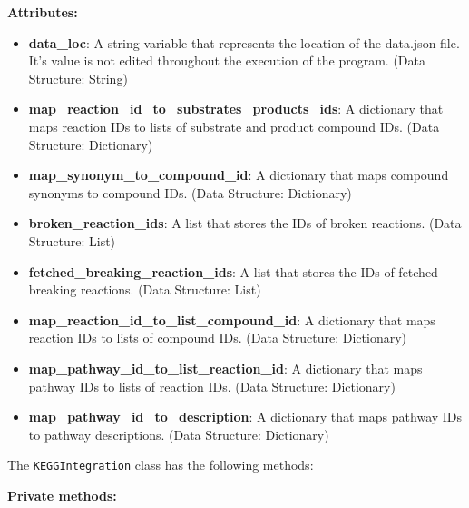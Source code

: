 \textbf{Attributes:}

\begin{itemize}
    \item \textbf{data\_loc}: A string variable that represents the location of the data.json file. It's value is not edited throughout the execution of the program. (Data Structure: String)
    \item \textbf{map\_reaction\_id\_to\_substrates\_products\_ids}: A dictionary that maps reaction IDs to lists of substrate and product compound IDs. (Data Structure: Dictionary)
    \item \textbf{map\_synonym\_to\_compound\_id}: A dictionary that maps compound synonyms to compound IDs. (Data Structure: Dictionary)
    \item \textbf{broken\_reaction\_ids}: A list that stores the IDs of broken reactions. (Data Structure: List)
    \item \textbf{fetched\_breaking\_reaction\_ids}: A list that stores the IDs of fetched breaking reactions. (Data Structure: List)
    \item \textbf{map\_reaction\_id\_to\_list\_compound\_id}: A dictionary that maps reaction IDs to lists of compound IDs. (Data Structure: Dictionary)
    \item \textbf{map\_pathway\_id\_to\_list\_reaction\_id}: A dictionary that maps pathway IDs to lists of reaction IDs. (Data Structure: Dictionary)
    \item \textbf{map\_pathway\_id\_to\_description}: A dictionary that maps pathway IDs to pathway descriptions. (Data Structure: Dictionary)
\end{itemize}

The \texttt{KEGGIntegration} class has the following methods:

\textbf{Private methods:}

